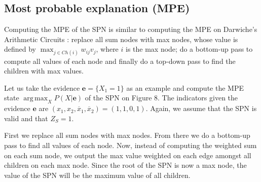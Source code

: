 \documentclass[a4paper,10pt]{article}
\DeclareMathOperator*{\argmax}{arg\,max}
\theoremstyle{plain}
\begin{document}
\begin{figure}[h]
\end{figure}

\subsection{Most probable explanation (MPE)}

Computing the MPE of the SPN is similar to computing the MPE on Darwiche's Arithmetic Circuits
\cite{diff-approach-darwiche}: replace all sum nodes with max nodes, whose value is defined by
$\max_{j\in Ch(i)}w_{ij}v_j$, where $i$ is the max node; do a bottom-up pass to compute all values
of each node and finally do a top-down pass to find the children with max values.

Let us take the evidence $\mathbf{e}=\{X_1=1\}$ as an example and compute the MPE state
$\argmax_X P(X|\mathbf{e})$ of the SPN on Figure 8. The indicators given the evidence $\mathbf{e}$
are $(x_1,x_2,\overline{x}_1,\overline{x}_2)=(1,1,0,1)$. Again, we assume that the SPN is valid and
that $Z_S=1$.

First we replace all sum nodes with max nodes. From there we do a bottom-up pass to find all values
of each node. Now, instead of computing the weighted sum on each sum node, we output the max value
weighted on each edge amongst all children on each max node. Since the root of the SPN is now a max
node, the value of the SPN will be the maximum value of all children.
\end{document}
